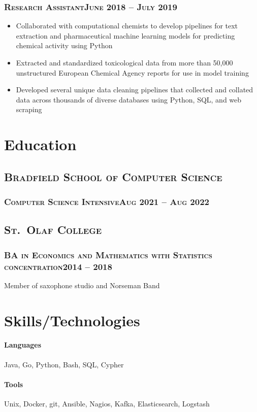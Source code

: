 \documentclass{article}
\newcommand{\resumeSection}[1]{\section*{#1}}
\newcommand{\institution}[1]{\subsection*{\scshape{#1}}}
\newcommand{\jobPosition}[3]{\subsubsection*{\scshape{#1}\hfill #2 -- #3}}
\begin{document}
    \jobPosition{Research Assistant}{June 2018}{July 2019}
    \begin{itemize}
      \item
            Collaborated with computational chemists to develop
            pipelines for text extraction and pharmaceutical machine
            learning models for predicting chemical activity using Python
      \item
            Extracted and standardized toxicological data from more
            than 50,000 unstructured European Chemical Agency reports
            for use in model training
      \item
            Developed several unique data cleaning pipelines that
            collected and collated data across thousands of diverse
            databases using Python, SQL, and web scraping
    \end{itemize}

\resumeSection{Education}
  \institution{Bradfield School of Computer Science}
    \jobPosition{Computer Science Intensive}{Aug 2021}{Aug 2022}

  \institution{St.\ Olaf College}
    \jobPosition{BA in Economics and Mathematics with Statistics concentration}{2014}{2018}
    Member of saxophone studio and Norseman Band

\resumeSection{Skills/Technologies}
  \paragraph{Languages}
    Java,
    Go,
    Python,
    Bash,
    SQL,
    Cypher
  \paragraph{Tools}
    Unix,
    Docker,
    git,
    Ansible,
    Nagios,
    Kafka,
    Elasticsearch,
    Logstash
\end{document}
